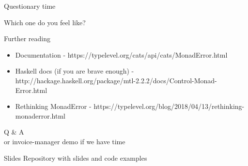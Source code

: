 \documentclass[13pt]{beamer}
\begin{document}
\begin{frame}{Questionary time}

  Which one do you feel like?

  \begin{figure}%
    \centering
    \qquad
  \end{figure}


\end{frame}

\begin{frame}{Further reading}
  \begin{itemize}
    \item Documentation - https://typelevel.org/cats/api/cats/MonadError.html
    \item Haskell docs (if you are brave enough) - http://hackage.haskell.org/package/mtl-2.2.2/docs/Control-Monad-Error.html
    \item Rethinking MonadError - https://typelevel.org/blog/2018/04/13/rethinking-monaderror.html
  \end{itemize}
\end{frame}

\begin{frame}[plain, c]
  \begin{center}
  {\Huge Q \& A}\\

  {\tiny or invoice-manager demo if we have time}
  \end{center}
\end{frame}

\begin{frame}{Slides}
  Repository with slides and code examples \href{https://github.com/DReigada/presentations/tree/master/monad-error}{\color{blue}{here}}
\end{frame}
\end{document}
